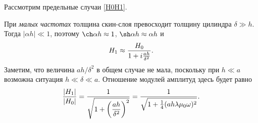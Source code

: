 %
%


Рассмотрим предельные случаи \eqref{H0H1}.

При \emph{малых частотах} толщина скин-слоя превосходит толщину цилиндра 
$\delta \gg h$. Тогда $|\alpha h| \ll 1$, 
поэтому $\ch \alpha h \approx 1$, $\sh \alpha h\approx \alpha h$ и
\begin{equation}\eqmark{H1}
H_1 \approx \frac{H_0}{1 + i \frac{a h}{\delta ^2}}.
\end{equation}
Заметим, что величина $ah/\delta^2$ в общем случае не мала, поскольку 
при $h\ll a$ возможна ситуация $h\ll \delta \ll a$.
Отношение модулей амплитуд здесь будет равно
\begin{equation} \eqmark{27}
\frac{|H_1|}{|H_0|} = \frac{1}{\sqrt{1+\left(\dfrac{ah}{\delta^2}\right)^2}} = 
\frac{1}{\sqrt{1+\frac14 (ah \lambda \mu_0 \omega)^2}}.
\end{equation}

